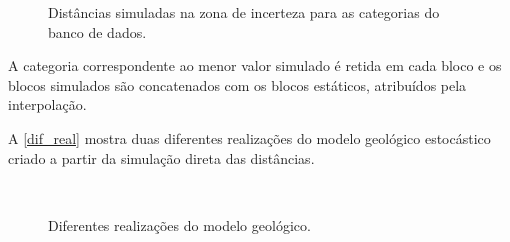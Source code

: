\begin{figure}[H] 
    \caption{Distâncias simuladas na zona de incerteza para as categorias do banco de dados.} \label{dist_sim_u}
     \centering
\end{figure}

A categoria correspondente ao menor valor simulado é retida em cada bloco e os blocos simulados são concatenados com os blocos estáticos, atribuídos pela interpolação.

A \autoref{dif_real} mostra duas diferentes realizações do modelo geológico estocástico criado a partir da simulação direta das distâncias.

\begin{figure}[H]
\caption{Diferentes realizações do modelo geológico.} 
\label{dif_real}
\begin{center}
\\
\end{center}
\begin{center}
\end{center}
\end{figure}

